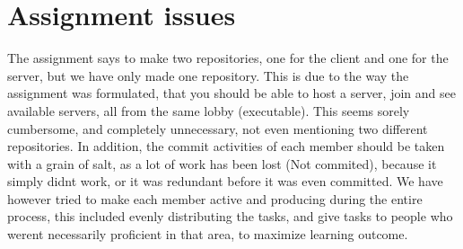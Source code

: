 \section*{Assignment issues}

The assignment says to make two repositories, one for the client and one for the server, but we have only made one repository. This is due to the way the assignment was formulated, that you should be able to host a server, join and see available servers, all from the same lobby (executable). This seems sorely cumbersome, and completely unnecessary, not even mentioning two different repositories. In addition, the commit activities of each member should be taken with a grain of salt, as a lot of work has been lost (Not commited), because it simply didn\textquotesingle{}t work, or it was redundant before it was even committed. We have however tried to make each member active and producing during the entire process, this included evenly distributing the tasks, and give tasks to people who weren\textquotesingle{}t necessarily proficient in that area, to maximize learning outcome. 